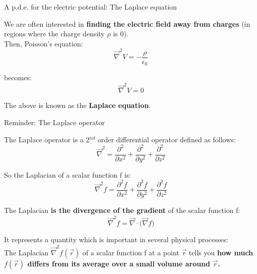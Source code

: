 %
%
%

\begin{frame}{A p.d.e. for the electric potential: The Laplace equation}

We are often interested in {\bf finding the electric field away from charges}
(in regions where the charge density $\rho$ is 0).\\
\vspace{0.3cm}
Then, Poisson's equation:
\begin{equation*}
  \vec{\nabla}^{2} V = - \frac{\rho}{\epsilon_0}
\end{equation*}

becomes:
\begin{equation*}
  \vec{\nabla}^{2} V = 0
\end{equation*}

\vspace{0.3cm}
The above is known as the {\bf Laplace equation}.

\end{frame}

%
%
%

{
\reminderslide

%
%
%

\begin{frame}{Reminder: The Laplace operator}

The Laplace operator is a 2$^{nd}$ order differential operator defined as follows:
\begin{equation*}
  \vec{\nabla}^{2} = \frac{\partial^2}{\partial x^2} + \frac{\partial^2}{\partial y^2} + \frac{\partial^2}{\partial z^2}
\end{equation*}

So the Laplacian of a scalar function f is:
\begin{equation*}
  \vec{\nabla}^{2}f = \frac{\partial^2 f}{\partial x^2} + \frac{\partial^2 f}{\partial y^2} + \frac{\partial^2 f}{\partial z^2}
\end{equation*}

The Laplacian {\bf is the divergence of the gradient} of the scalar function f:
\begin{equation*}
  \vec{\nabla}^{2} f =  \vec{\nabla} \cdot \Big( \vec{\nabla} f \Big)
\end{equation*}

It represents a quantity which is important in several physical processes:\\
The Laplacian $\vec{\nabla}^{2} f(\vec{r})$ of a scalar function f at a point $\vec{r}$
tells you {\bf how much $f(\vec{r})$ differs from its average over a small volume around $\vec{r}$.}

\end{frame}

} %


